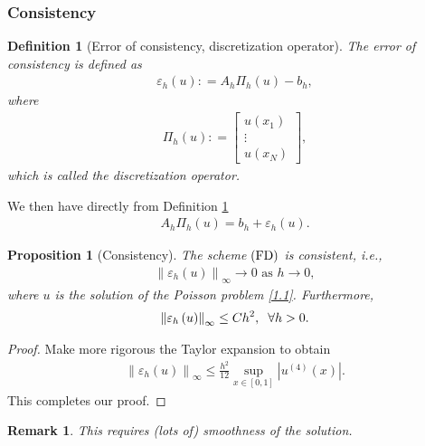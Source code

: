 \documentclass[11pt,a4paper,center,notitlepage]{article}
\numberwithin{equation}{section}
\newtheorem{definition}{Definition}[section]
\newtheorem{prop}{Proposition}[section]
\newtheorem{remark}{Remark}[section]
\begin{document}
\subsubsection{Consistency}
\begin{definition}[Error of consistency, discretization operator]\label{Definition1.1}
The error of consistency is defined as
\begin{align}
{\varepsilon _h}\left( u \right): = {A_h}{\Pi _h}\left( u \right) - {b_h},
\end{align}
where 
\begin{align}
{\Pi _h}\left( u \right): = \left[ {\begin{array}{*{20}{c}}
{u\left( {{x_1}} \right)}\\
 \vdots \\
{u\left( {{x_N}} \right)}
\end{array}} \right],
\end{align}
which is called the discretization operator. 
\end{definition}
We then have directly from Definition \ref{Definition1.1}
\begin{align}
{A_h}{\Pi _h}\left( u \right) = {b_h} + {\varepsilon _h}\left( u \right).
\end{align}
\begin{prop}[Consistency]
The scheme $\left( {\rm FD}\right)$ is consistent, i.e.,
\begin{align}
{\left\| {{\varepsilon _h}\left( u \right)} \right\|_\infty } \to 0 \mbox{ as } h \to 0,
\end{align}
where $u$ is the solution of the Poisson problem \eqref{1.1}. Furthermore,
\begin{align}
{\left\| {{\varepsilon _h}\left( u \right)} \right\|_\infty } \le C{h^2}, \hspace{2mm} \forall  h>0.
\end{align}
\end{prop}
\begin{proof}
Make more rigorous the Taylor expansion to obtain
\begin{align}
\label{1.17}
{\left\| {{\varepsilon _h}\left( u \right)} \right\|_\infty } \le \frac{{{h^2}}}{{12}}\mathop {\sup }\limits_{x \in \left[ {0,1} \right]} \left| {{u^{\left( 4 \right)}}\left( x \right)} \right|.
\end{align}
This completes our proof.
\end{proof}
\begin{remark}
This requires (lots of) smoothness of the solution.
\end{remark}
\end{document}

